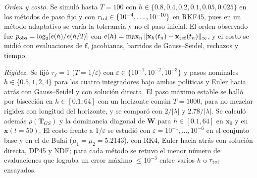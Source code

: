 \emph{Orden y costo.} Se simuló hasta $T=100$ con $h\in\{0.8,0.4,0.2,0.1,0.05,0.025\}$ en los métodos de paso fijo y con $r_{\rm tol}\in\{10^{-4},\dots,10^{-10}\}$ en RKF45, pues en un método adaptativo se varía la tolerancia y no el paso inicial. El orden observado fue $p_{\rm obs}=\log_2[e(h)/e(h/2)]$ con $e(h)=\max_n\|\mathbf x_h(t_n)-\mathbf x_{\rm ref}(t_n)\|_\infty$, y el costo se midió con evaluaciones de $\mathbf f$, jacobianas, barridos de Gauss--Seidel, rechazos y tiempo.

\emph{Rigidez.} Se fijó $\tau_f=1$ ($T=1/\varepsilon$) con $\varepsilon\in\{10^{-1},10^{-2},10^{-3}\}$ y pasos nominales $h\in\{0.5,1,2,4\}$ para los cuatro integradores bajo ambas políticas y Euler hacia atrás con Gauss--Seidel y con solución directa. El paso máximo estable se halló por bisección en $h\in[0.1,64]$ con un horizonte común $T=1000$, para no mezclar rigidez con longitud del horizonte, y se comparó con $2/|\lambda|$ y $2.78/|\lambda|$. Se calculó además $\rho(\mathbf T_{GS})$ y la dominancia diagonal de $\mathbf W$ para $h\in[0.1,64]$ en $\mathbf x_0$ y en $\mathbf x(t=50)$. El costo frente a $1/\varepsilon$ se estudió con $\varepsilon=10^{-1},\dots,10^{-6}$ en el conjunto base y en el de Bulai ($\mu_1=\mu_2=5.2143$), con RK4, Euler hacia atrás con solución directa, DP45 y NDF; para cada método se retuvo el menor número de evaluaciones que lograba un error máximo $\le10^{-3}$ entre varios $h$ o $r_{\rm tol}$ ensayados.

